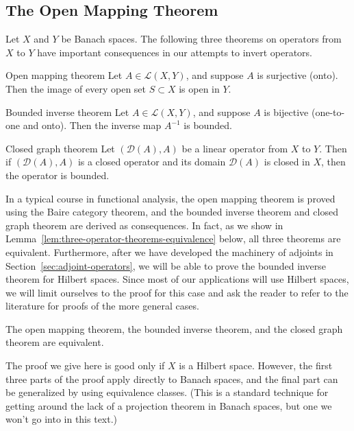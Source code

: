 \subsection{The Open Mapping Theorem}\label{sec:open-mapping-theorem}

Let $X$ and $Y$ be Banach spaces. The following three theorems on operators from $X$ to $Y$ have important consequences in our attempts to invert operators.

\begin{Theorem}{Open mapping theorem}
\label{thm:open-mapping}
Let $A\in\mathcal{L}(X,Y)$, and suppose $A$ is surjective (onto). Then the image of every open set $S\subset X$ is open in $Y$.
\end{Theorem}

\begin{Theorem}{Bounded inverse theorem}
\label{thm:bounded-inverse}
Let $A\in\mathcal{L}(X,Y)$, and suppose $A$ is bijective (one-to-one and onto). Then the inverse map $A^{-1}$ is bounded.
\end{Theorem}

\begin{Theorem}{Closed graph theorem}
\label{thm:closed-graph}
Let $(\mathcal{D}(A),A)$ be a linear operator from $X$ to $Y$. Then if $(\mathcal{D}(A),A)$ is a closed operator and its domain $\mathcal{D}(A)$ is closed in $X$, then the operator is bounded.
\end{Theorem}

In a typical course in functional analysis, the open mapping theorem is proved using the Baire category theorem, and the bounded inverse theorem and closed graph theorem are derived as consequences. In fact, as we show in Lemma~\ref{lem:three-operator-theorems-equivalence} below, all three theorems are equivalent. Furthermore, after we have developed the machinery of adjoints in Section~\ref{sec:adjoint-operators}, we will be able to prove the bounded inverse theorem for Hilbert spaces. Since most of our applications will use Hilbert spaces, we will limit ourselves to the proof for this case and ask the reader to refer to the literature for proofs of the more general cases.

\begin{Lemma}
\label{lem:three-operator-theorems-equivalence}
The open mapping theorem, the bounded inverse theorem, and the closed graph theorem are equivalent.
\end{Lemma}

The proof we give here is good only if $X$ is a Hilbert space. However, the first three parts of the proof apply directly to Banach spaces, and the final part can be generalized by using equivalence classes. (This is a standard technique for getting around the lack of a projection theorem in Banach spaces, but one we won't go into in this text.)

